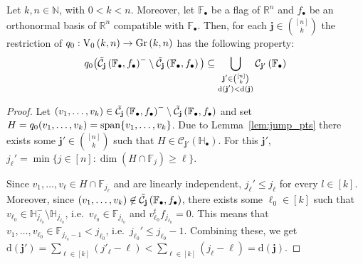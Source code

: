 \begin{lemma}\label{lem:q0_on_bdr} Let $k,n\in\mathbb{N}$, with $0<k<n$. Moreover, let $\mathbb{F}_{\bullet}$ be a flag of $\mathbb{R}^n$ and $f_{\bullet}$ be an orthonormal basis of $\mathbb{R}^n$ compatible with $\mathbb{F}_{\bullet}$. Then, for each $\mathbf{j}\in\binom{[n]}{k}$ the restriction of $q_0:\StO{k}{n}\to\Gr{k}{n}$ has the following property:
\[q_0\big(\tilde{\mathcal{C}}_{\mathbf{j}}\left(\mathbb{F}_{\bullet},f_{\bullet}\right)^-\setminus\tilde{\mathcal{C}}_{\mathbf{j}}\left(\mathbb{F}_{\bullet},f_{\bullet}\right)\big)\subseteq\bigcup_{\substack{\mathbf{j}'\in\binom{[n]}{k}\\\mathrm{d}(\mathbf{j}')<\mathrm{d}(\mathbf{j})}}\mathcal{C}_{\mathbf{j'}}\left(\mathbb{F}_{\bullet}\right)\]
\end{lemma}
\begin{proof} Let $(v_1,\ldots,v_k)\in\tilde{\mathcal{C}}_{\mathbf{j}}\left(\mathbb{F}_{\bullet},f_{\bullet}\right)^-\setminus\tilde{\mathcal{C}}_{\mathbf{j}}\left(\mathbb{F}_{\bullet},f_{\bullet}\right)$ and set $H=q_0(v_1,\ldots,v_k)=\mathrm{span}\{v_1,\ldots,v_k\}$. Due to Lemma~\ref{lem:jump_pts} there exists some $\mathbf{j}'\in\binom{[n]}{k}$ such that $H\in\mathcal{C}_{\mathbf{j}'}(\mathbb{H}_{\bullet})$. For this $\mathbf{j}'$,
$j_{\ell}'=\min\{j\in[n]:\dim(H\cap\mathbb{F}_j)\geq\ell\}$.

Since $v_1,\ldots,v_{\ell}\in H\cap\mathbb{F}_{j_{\ell}}$ and are linearly independent, $j_{\ell}'\leq j_{\ell}$ for every $l\in[k]$. Moreover, since $(v_1,\ldots,v_k)\not\in\tilde{\mathcal{C}}_{\mathbf{j}}\left(\mathbb{F}_{\bullet},f_{\bullet}\right)$, there exists some $\ell_0\in[k]$ such that $v_{\ell_0}\in\mathbb{H}_{j_{\ell_0}}^-\setminus\mathbb{H}_{j_{\ell_0}}$, i.e.\ $v_{\ell_0}\in\mathbb{F}_{j_{\ell_0}}$ and $v_{\ell_0}^tf_{j_{\ell_0}}=0$. This means that $v_1,\ldots,v_{\ell_0}\in\mathbb{F}_{j_{\ell_0}-1}<j_{\ell_0}$, i.e.\ $j_{\ell_0}'\leq j_{\ell_0}-1$. Combining these, we get
$\mathrm{d}(\mathbf{j}')=\sum_{\ell\in[k]}(j'_{\ell}-\ell)<\sum_{\ell\in[k]}(j_{\ell}-\ell)=\mathrm{d}(\mathbf{j})$.
\end{proof}

